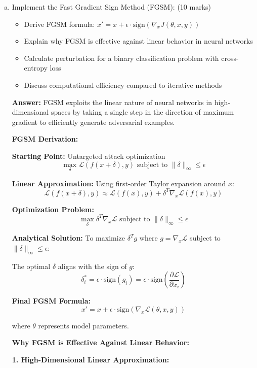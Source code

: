 \documentclass[12pt]{article}
\newcommand{\answer}[1]{{\color{answercolor}\textbf{Answer:} #1}}
\newcommand{\explanation}[1]{{\color{explanationcolor}#1}}
\begin{document}
\begin{enumerate}[(a)]
    \item Implement the Fast Gradient Sign Method (FGSM): \hfill (10 marks)
    \begin{itemize}
        \item Derive FGSM formula: $x' = x + \epsilon \cdot \text{sign}(\nabla_x J(\theta, x, y))$
        \item Explain why FGSM is effective against linear behavior in neural networks
        \item Calculate perturbation for a binary classification problem with cross-entropy loss
        \item Discuss computational efficiency compared to iterative methods
    \end{itemize}
    
    \answer{FGSM exploits the linear nature of neural networks in high-dimensional spaces by taking a single step in the direction of maximum gradient to efficiently generate adversarial examples.}
    
    \explanation{
    \textbf{FGSM Derivation:}
    
    \textbf{Starting Point:} Untargeted attack optimization
    $$\max_{\delta} \mathcal{L}(f(x + \delta), y) \text{ subject to } \|\delta\|_\infty \leq \epsilon$$
    
    \textbf{Linear Approximation:}
    Using first-order Taylor expansion around $x$:
    $$\mathcal{L}(f(x + \delta), y) \approx \mathcal{L}(f(x), y) + \delta^T \nabla_x \mathcal{L}(f(x), y)$$
    
    \textbf{Optimization Problem:}
    $$\max_{\delta} \delta^T \nabla_x \mathcal{L} \text{ subject to } \|\delta\|_\infty \leq \epsilon$$
    
    \textbf{Analytical Solution:}
    To maximize $\delta^T g$ where $g = \nabla_x \mathcal{L}$ subject to $\|\delta\|_\infty \leq \epsilon$:
    
    The optimal $\delta$ aligns with the sign of $g$:
    $$\delta_i^* = \epsilon \cdot \text{sign}(g_i) = \epsilon \cdot \text{sign}\left(\frac{\partial \mathcal{L}}{\partial x_i}\right)$$
    
    \textbf{Final FGSM Formula:}
    $$x' = x + \epsilon \cdot \text{sign}(\nabla_x \mathcal{L}(\theta, x, y))$$
    
    where $\theta$ represents model parameters.
    
    \textbf{Why FGSM is Effective Against Linear Behavior:}
    
    \textbf{1. High-Dimensional Linear Approximation:}
    
}
\end{enumerate}
\end{document}
